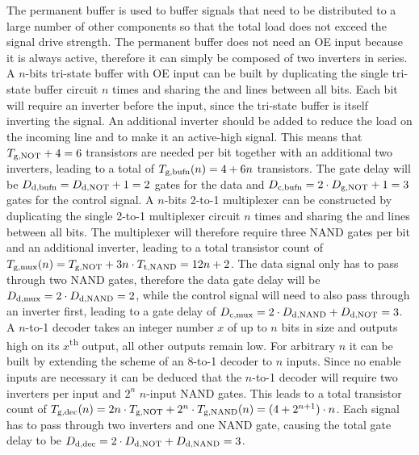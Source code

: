 \begin{itemize}
    The permanent buffer is used to buffer signals that need to be distributed to a large number of other components so that the total load does not exceed the signal drive strength. The permanent buffer does not need an \ac{OE} input because it is always active, therefore it can simply be composed of two inverters in series.
    A $n$-bits tri-state buffer with \ac{OE} input can be built by duplicating the single tri-state buffer circuit\cite[Figure 4]{asakura2003tri} $n$ times and sharing the  and  lines between all bits. Each bit will require an inverter before the input, since the tri-state buffer is itself inverting the signal. An additional inverter should be added to reduce the load on the incoming  line and to make it an active-high signal. This means that $\f{T}{g}{NOT} + 4 = 6$ transistors are needed per bit together with an additional two inverters, leading to a total of $\f{T}{g}{bufn}(n) = 4 + 6n$ transistors. The gate delay will be $\f{D}{d}{bufn} = \f{D}{d}{NOT} + 1 = 2$ gates for the data and $\f{D}{c}{bufn} = 2 \cdot \f{D}{g}{NOT} + 1 = 3$ gates for the control signal.
    A $n$-bits 2-to-1 multiplexer can be constructed by duplicating the single 2-to-1 multiplexer circuit\cite[Figure 4]{7375632} $n$ times and sharing the  and  lines between all bits. The multiplexer will therefore require three NAND gates per bit and an additional inverter, leading to a total transistor count of $\f{T}{g}{mux}(n) = \f{T}{g}{NOT} + 3n \cdot \f{T}{t}{NAND} = 12n + 2$. The data signal only has to pass through two NAND gates, therefore the data gate delay will be $\f{D}{d}{mux} = 2 \cdot \f{D}{d}{NAND} = 2$, while the control signal will need to also pass through an inverter first, leading to a gate delay of $\f{D}{c}{mux} = 2 \cdot \f{D}{d}{NAND} + \f{D}{d}{NOT} = 3$.
    A $n$-to-1 decoder takes an integer number $x$ of up to $n$ bits in size and outputs high on its $x$\textsuperscript{th} output, all other outputs remain low. For arbitrary $n$ it can be built by extending the scheme of an 8-to-1 decoder\cite{74x138} to $n$ inputs. Since no enable inputs are necessary it can be deduced that the $n$-to-1 decoder will require two inverters per input and $2^{n}$ $n$-input NAND gates. This leads to a total transistor count of $\f{T}{g}{dec}(n) = 2n \cdot \f{T}{g}{NOT} + 2^{n} \cdot \f{T}{g}{NAND}(n) = (4 + 2^{n+1}) \cdot n$. Each signal has to pass through two inverters and one NAND gate, causing the total gate delay to be $\f{D}{d}{dec} = 2 \cdot \f{D}{d}{NOT} + \f{D}{d}{NAND} = 3$.

\end{itemize}
